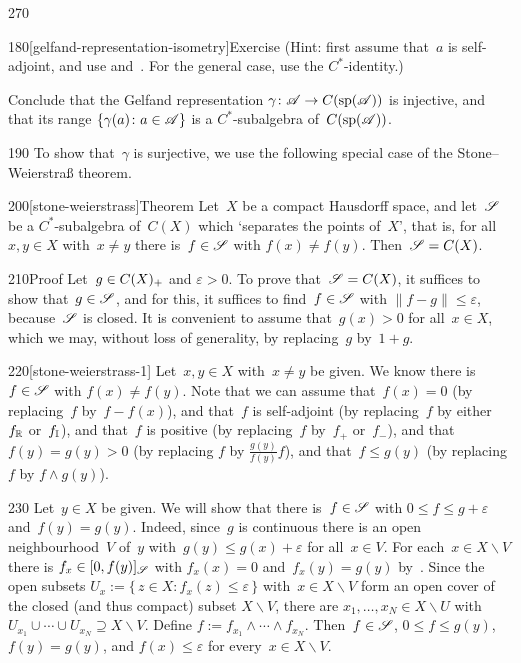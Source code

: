 \begin{parsec}{270}
\begin{point}{180}[gelfand-representation-isometry]{Exercise}
(Hint: first assume that~$a$ is self-adjoint,
and use  and~.
For the general case,
use the $C^*$-identity.)

Conclude that the Gelfand representation $\gamma\colon \mathscr{A}\to C(\mathrm{sp}(\mathscr{A}))$
is injective,
and that its range $\{\gamma(a)\colon a\in\mathscr{A}\}$
is a $C^*$-subalgebra of~$C(\mathrm{sp}(\mathscr{A}))$.
\end{point}
\begin{point}{190}%
To show that~$\gamma$ is surjective,
we use the following special case of
the Stone--Weierstra\ss{} theorem.%
\end{point}
\begin{point}{200}[stone-weierstrass]{Theorem}%
Let~$X$ be a compact Hausdorff space,
and let~$\mathscr{S}$ be a $C^*$-subalgebra of~$C(X)$
which `separates the points of~$X$',
that is, for all~$x,y\in X$ with~$x\neq y$
there is~$f\in \mathscr{S}$ with $f(x)\neq f(y)$.
Then~$\mathscr{S}=C(X)$.
\begin{point}{210}{Proof}%
Let~$g\in C(X)_{+}$ and $\varepsilon >0$.
To prove that~$\mathscr{S}=C(X)$,
it suffices to show that~$g\in \mathscr{S}$,
and for this,
it suffices to find~$f\in \mathscr{S}$ with $\|f-g\|\leq \varepsilon$,
because~$\mathscr{S}$ is closed.
It is convenient to assume that~$g(x)> 0$ for all~$x\in X$,
which we may, without loss of generality,
by replacing~$g$ by~$1+g$.
\begin{point}{220}[stone-weierstrass-1]%
Let~$x,y\in X$ with~$x\neq y$
be given.
We know there is~$f\in \mathscr{S}$ with $f(x)\neq f(y)$.
Note that we can assume that~$f(x)=0$ (by replacing~$f$ by~$f-f(x)$),
and that~$f$ is self-adjoint (by replacing~$f$
by either~$f_{\mathbb{R}}$ or~$f_{\mathbb{I}}$),
and that~$f$ is positive
(by replacing~$f$ by~$f_+$ or~$f_-$),
and that~$f(y)=g(y)>0$
(by replacing $f$ by $\frac{g(y)}{f(y)} f$),
and that~$f\leq g(y)$
(by replacing $f$ by $f\wedge g(y)$).
\end{point}
\begin{point}{230}%
Let~$y\in X$ be given.
We will show that there is~$f\in\mathscr{S}$
with $0\leq f\leq g+\varepsilon$
and~$f(y)=g(y)$.
Indeed,
since~$g$ is continuous
there is an open neighbourhood~$V$ of~$y$
with~$g(y) \leq  g(x)+\varepsilon$
for all~$x\in V$.
For each~$x\in X\backslash V$ there is $f_x \in [0,f(y)]_{\mathscr{S}}$
with $f_x(x)=0$ and~$f_x(y)=g(y)$ by~.
Since the open subsets
$U_x := \{\,z\in X\colon f_x(z)\leq \varepsilon\,\}$
with~$x\in X\backslash V$
form an open cover of the closed (and thus compact) subset $X\backslash V$,
there are $x_1,\dotsc,x_N\in X\backslash U$
with $U_{x_1}\cup\dotsb\cup U_{x_N}\supseteq X\backslash V$.
Define $f:=f_{x_1}\wedge \dotsb \wedge f_{x_N}$.
Then~$f\in \mathscr{S}$, $0\leq f\leq g(y)$, $f(y)=g(y)$,
and $f(x)\leq \varepsilon$
for every~$x\in X\backslash V$.


\end{point}
\end{point}
\end{point}
\end{parsec}
